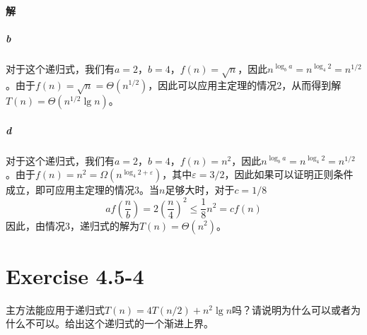 \documentclass{article}
\begin{document}
\paragraph{解}
\subparagraph{b}
对于这个递归式，我们有$a=2$，$b=4$，$f(n)=\sqrt{n}$，因此$n^{\log_b{a}}=n^{\log_4{2}}=n^{1/2}$。由于$f(n)=\sqrt{n}=\Theta\left(n^{1/2}\right)$，因此可以应用主定理的情况2，从而得到解$T(n)=\Theta\left(n^{1/2} \lg{n}\right)$。
\subparagraph{d}
对于这个递归式，我们有$a=2$，$b=4$，$f(n)=n^2$，因此$n^{\log_b{a}}=n^{\log_4{2}}=n^{1/2}$。由于$f(n)=n^2=\Omega\left(n^{\log_4{2}+\varepsilon}\right)$，其中$\varepsilon = 3/2$，因此如果可以证明正则条件成立，即可应用主定理的情况3。当$n$足够大时，对于$c=1/8$
\begin{equation*}
    a f\left(\frac{n}{b}\right) = 2\left(\frac{n}{4}\right)^2 \leq \frac{1}{8}n^2 = c f(n)
\end{equation*}
因此，由情况3，递归式的解为$T(n) = \Theta\left(n^2\right)$。
\\

\section{Exercise 4.5-4}
主方法能应用于递归式$T(n)=4T(n/2)+n^2\lg{n}$吗？请说明为什么可以或者为什么不可以。给出这个递归式的一个渐进上界。
\\
\end{document}
